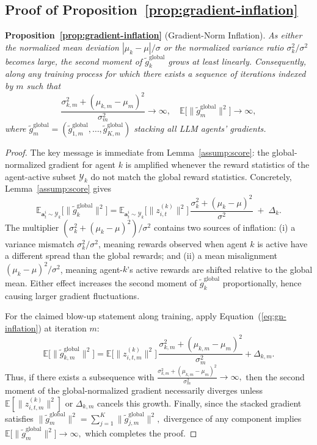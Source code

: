 \subsection{Proof of Proposition~\ref{prop:gradient-inflation}}
\label{app:proof_prop_gradient_inflation}
\textbf{Proposition~\ref{prop:gradient-inflation}} (Gradient-Norm Inflation).
\textit{
As either the normalized mean deviation
$|\mu_k - \mu| / \sigma$ or the normalized variance ratio
$\sigma_k^2 / \sigma^2$ becomes large, the second moment of
$\tilde{g}_k^{\mathrm{global}}$ grows at least linearly. Consequently, along any training process for which
there exists a sequence of iterations indexed by $m$ such that
$$
\frac{\sigma_{k,m}^2 + (\mu_{k,m} - \mu_m)^2}{\sigma_m^2} \to \infty, \quad  \mathbb{E}\bigl[\|\tilde{g}_m^{\mathrm{global}}\|^2\bigr] \to \infty,
$$
where $\tilde{g}_{m}^{\mathrm{global}} = (\tilde{g}_{1,m}^{\mathrm{global}},\dots,\tilde{g}_{K,m}^{\mathrm{global}})$ stacking all LLM agents' gradients.
}

\begin{proof}
The key message is immediate from Lemma~\ref{assump:score}: the global-normalized
gradient for agent $k$ is amplified whenever the reward statistics of the
agent-active subset $\mathcal{Y}_k$ do not match the global reward statistics.
Concretely, Lemma~\ref{assump:score} gives
\begin{equation}\label{eq:gn-inflation}
\mathbb{E}_{\bm{a}_t^i\sim \mathcal{Y}_k}\!\big[\|\tilde{g}_k^{\mathrm{global}}\|^2\big]
=
\mathbb{E}_{\bm{a}_t^i\sim \mathcal{Y}_k}\!\big[\|z_{i,t}^{(k)}\|^2\big]\,
\frac{\sigma_k^2 + (\mu_k - \mu)^2}{\sigma^2} \;+\; \Delta_k .
\end{equation}
The multiplier
\(
(\sigma_k^2 + (\mu_k-\mu)^2)/\sigma^2
\)
contains two sources of inflation: (i) a variance mismatch $\sigma_k^2/\sigma^2$, meaning rewards observed when agent $k$ is active have a different spread than the global rewards; and (ii) a mean misalignment $(\mu_k-\mu)^2/\sigma^2$, meaning agent-$k$'s active rewards are shifted relative to the global mean. Either effect increases the second moment of $\tilde{g}_k^{\mathrm{global}}$ proportionally, hence causing larger gradient fluctuations.

For the claimed blow-up statement along training, apply Equation~(\ref{eq:gn-inflation}) at
iteration $m$:
\[
\mathbb{E}\big[\|\tilde{g}_{k,m}^{\mathrm{global}}\|^2\big]
=
\mathbb{E}\big[\|z_{i,t,m}^{(k)}\|^2\big]\,
\frac{\sigma_{k,m}^2 + (\mu_{k,m} - \mu_m)^2}{\sigma_m^2}
+\Delta_{k,m}.
\]
Thus, if there exists a subsequence with
\(
\frac{\sigma_{k,m}^2 + (\mu_{k,m} - \mu_m)^2}{\sigma_m^2}\to\infty,
\)
then the second moment of the global-normalized gradient necessarily diverges
unless $\mathbb{E}[\|z_{i,t,m}^{(k)}\|^2]$ or $\Delta_{k,m}$ cancels this growth.
Finally, since the stacked gradient satisfies
\(
\|\tilde{g}_m^{\mathrm{global}}\|^2=\sum_{j=1}^K \|\tilde{g}_{j,m}^{\mathrm{global}}\|^2,
\)
divergence of any component implies
\(
\mathbb{E}\big[\|\tilde{g}_m^{\mathrm{global}}\|^2\big]\to\infty,
\)
which completes the proof.
\end{proof}


